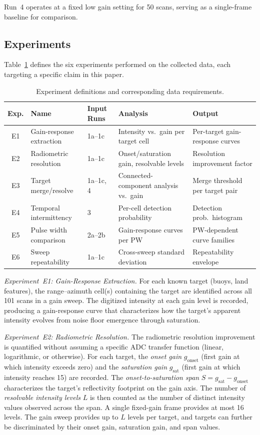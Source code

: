 \documentclass[twocolumn, 10pt]{article}
\begin{document}
Run~4 operates at a fixed low gain setting for 50 scans, serving as a single-frame baseline for comparison.

\subsection{Experiments}

Table~\ref{tab:experiments} defines the six experiments performed on the collected data, each targeting a specific claim in this paper.

\begin{table}[t]
\caption{Experiment definitions and corresponding data requirements.}
\label{tab:experiments}
\centering
\begin{tabular}{c l l l l}
\toprule
\textbf{Exp.} & \textbf{Name} & \textbf{Input Runs} & \textbf{Analysis} & \textbf{Output} \\
\midrule
E1 & Gain-response extraction & 1a--1c & Intensity vs.\ gain per target cell & Per-target gain-response curves \\
E2 & Radiometric resolution & 1a--1c & Onset/saturation gain, resolvable levels & Resolution improvement factor \\
E3 & Target merge/resolve & 1a--1c, 4 & Connected-component analysis vs.\ gain & Merge threshold per target pair \\
E4 & Temporal intermittency & 3 & Per-cell detection probability & Detection prob.\ histogram \\
E5 & Pulse width comparison & 2a--2b & Gain-response curves per PW & PW-dependent curve families \\
E6 & Sweep repeatability & 1a--1c & Cross-sweep standard deviation & Repeatability envelope \\
\bottomrule
\end{tabular}
\end{table}

\textit{Experiment~E1: Gain-Response Extraction.} For each known target (buoys, land features), the range--azimuth cell(s) containing the target are identified across all 101 scans in a gain sweep. The digitized intensity at each gain level is recorded, producing a gain-response curve that characterizes how the target's apparent intensity evolves from noise floor emergence through saturation.

\textit{Experiment~E2: Radiometric Resolution.} The radiometric resolution improvement is quantified without assuming a specific ADC transfer function (linear, logarithmic, or otherwise). For each target, the \textit{onset gain} $g_{\text{onset}}$ (first gain at which intensity exceeds zero) and the \textit{saturation gain} $g_{\text{sat}}$ (first gain at which intensity reaches 15) are recorded. The \textit{onset-to-saturation span} $S = g_{\text{sat}} - g_{\text{onset}}$ characterizes the target's reflectivity footprint on the gain axis. The number of \textit{resolvable intensity levels} $L$ is then counted as the number of distinct intensity values observed across the span. A single fixed-gain frame provides at most 16 levels. The gain sweep provides up to $L$ levels per target, and targets can further be discriminated by their onset gain, saturation gain, and span values.
\end{document}

